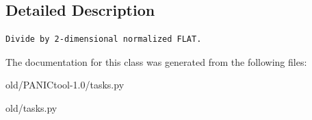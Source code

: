 \subsection{Detailed Description}


\footnotesize\begin{verbatim}Divide by 2-dimensional normalized FLAT.
\end{verbatim}
\normalsize
 



The documentation for this class was generated from the following files:\begin{CompactItemize}
\item 
old/PANICtool-1.0/tasks.py\item 
old/tasks.py\end{CompactItemize}

